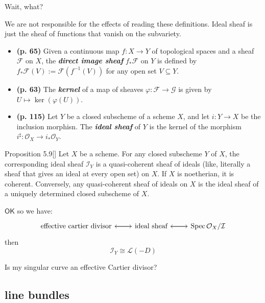 Wait, what?

We are not responsible for the effects of reading these definitions. Ideal sheaf is just the sheaf of functions that vanish on the subvariety.
\begin{itemize}
\item \textbf{(p. 65)} Given a continuous map \(f:X \to Y\) of topological spaces and a sheaf \(\mathcal{F}\) on \(X\), the \textit{\textbf{direct image sheaf}} \(f_*\mathcal{F}\) on \(Y\) is defined by \(f_*\mathcal{F}(V):=\mathcal{F}(f^{-1}(V))\) for any open set \(V \subseteq Y\).

\item \textbf{(p. 63)} The \textit{\textbf{kernel}} of a map of sheaves \(\varphi: \mathcal{F} \to \mathcal{G}\) is given by \(U \mapsto  \ker(\varphi(U))\).

\item \textbf{(p. 115)} Let \(Y\) be a closed subscheme of a scheme \(X\), and let \(i:Y \to X\) be the inclusion morphisn. The \textit{\textbf{ideal sheaf}} of \(Y\) is the kernel of the morphism \(i^\sharp:\mathcal{O}_X \to i_*\mathcal{O}_Y\).
\end{itemize}

\begin{thing6}{Proposition 5.9}[\cite{har}]\label{prop:5.9}\leavevmode
Let \(X\) be a scheme. For any closed subscheme \(Y\) of \(X\), the corresponding ideal sheaf \(\mathcal{I}_Y\) is a quasi-coherent sheaf of ideals (like, literally a sheaf that gives an ideal at every open set) on \(X\). If \(X\) is noetherian, it is coherent. Conversely, any quasi-coherent sheaf of ideals on \(X\) is the ideal sheaf of a uniquely determined closed subscheme of \(X\).
\end{thing6}

\(\mathsf{OK}\) so we have:
\[\begin{tikzcd}
	\text{effective cartier divisor} \arrow[r]&\text{ideal sheaf}\arrow[l]\arrow[r]&\operatorname{Spec}\mathcal{O}_X/\mathcal{I}\arrow[l]
\end{tikzcd}\]
then
\[\mathcal{I}_Y \cong \mathcal{L}(-D)\]

\begin{question}\leavevmode
Is my singular curve an effective Cartier divisor?
\end{question}

\subsection{line bundles}

